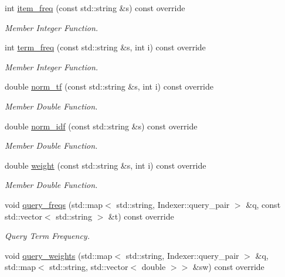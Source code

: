 \begin{DoxyCompactItemize}
\item 
int \hyperlink{class_sentence_indexer_a892b5cc701450698a04de74a3661928e}{item\+\_\+freq} (const std\+::string \&s) const override
\begin{DoxyCompactList}\small\item\em Member Integer Function. \end{DoxyCompactList}\item 
int \hyperlink{class_sentence_indexer_a54f8bbbce9e37c355fe435b26c16f1ac}{term\+\_\+freq} (const std\+::string \&s, int i) const override
\begin{DoxyCompactList}\small\item\em Member Integer Function. \end{DoxyCompactList}\item 
double \hyperlink{class_sentence_indexer_ada837ec334535e133c9ec511b369abfa}{norm\+\_\+tf} (const std\+::string \&s, int i) const override
\begin{DoxyCompactList}\small\item\em Member Double Function. \end{DoxyCompactList}\item 
double \hyperlink{class_sentence_indexer_a646014181566f20140cee5dbd16f52fa}{norm\+\_\+idf} (const std\+::string \&s) const override
\begin{DoxyCompactList}\small\item\em Member Double Function. \end{DoxyCompactList}\item 
double \hyperlink{class_sentence_indexer_ad436ab76195615090de457b50aabfe7b}{weight} (const std\+::string \&s, int i) const override
\begin{DoxyCompactList}\small\item\em Member Double Function. \end{DoxyCompactList}\item 
void \hyperlink{class_sentence_indexer_af059ce5526fad2995f5595ace00e51a3}{query\+\_\+freqs} (std\+::map$<$ std\+::string, Indexer\+::query\+\_\+pair $>$ \&q, const std\+::vector$<$ std\+::string $>$ \&t) const override
\begin{DoxyCompactList}\small\item\em Query Term Frequency. \end{DoxyCompactList}\item 
void \hyperlink{class_sentence_indexer_ad3835aaf2ff4a59fff85d596dfc95d5c}{query\+\_\+weights} (std\+::map$<$ std\+::string, Indexer\+::query\+\_\+pair $>$ \&q, std\+::map$<$ std\+::string, std\+::vector$<$ double $>$$>$ \&sw) const override
$$
\end{DoxyCompactItemize}
